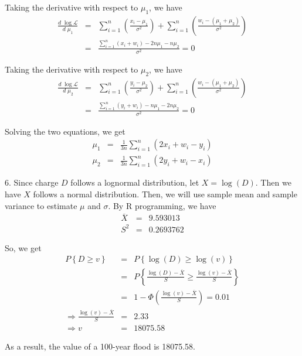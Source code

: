 \documentclass[12pt]{article}
\begin{document}
Taking the derivative with respect to $\mu_1$, we have
\begin{eqnarray*}
  \frac {d \; \log {\mathcal{L}}}{d \; \mu_1}
  &=& \sum_{i=1}^n \left( \frac{x_i - \mu_1}{\sigma^2} \right) + 
  \sum_{i=1}^n \left( \frac{w_i - (\mu_1+\mu_2)}{\sigma^2} \right) \\
  &=& \frac {\sum_{i=1}^n (x_i + w_i) - 2n \mu_1 - n \mu_2}{\sigma^2} = 0
\end{eqnarray*}

Taking the derivative with respect to $\mu_2$, we have
\begin{eqnarray*}
  \frac {d \; \log {\mathcal{L}}}{d \; \mu_2}
  &=& \sum_{i=1}^n \left( \frac{y_i - \mu_2}{\sigma^2} \right) + 
  \sum_{i=1}^n \left( \frac{w_i - (\mu_1+\mu_2)}{\sigma^2} \right) \\
  &=& \frac {\sum_{i=1}^n (y_i + w_i) - n \mu_1 - 2n \mu_2}{\sigma^2} = 0
\end{eqnarray*}

Solving the two equations, we get
\begin{eqnarray*}
  \mu_1 &=& \frac {1}{3n} \sum_{i=1}^n (2x_i + w_i - y_i) \\
  \mu_2 &=& \frac {1}{3n} \sum_{i=1}^n (2y_i + w_i - x_i)
\end{eqnarray*}

6. Since charge $D$ follows a lognormal distribution, let $X = \log (D)$. Then we have $X$ follows a normal distribution. Then, we will use sample mean and sample variance to estimate $\mu$ and $\sigma$. By R programming, we have
\begin{eqnarray*}
  \overline{X} &=& 9.593013 \\
  S^2 &=& 0.2693762
\end{eqnarray*}

So, we get
\begin{eqnarray*}
  P \left\{ D \ge v \right\}
  &=& P \left\{ \log (D) \ge \log (v) \right\} \\
  &=& P \left\{ \frac {\log (D) - \overline{X}}{S}
    \ge \frac {\log (v) - \overline{X}}{S} \right\} \\
  &=& 1 - \Phi \left( \frac {\log (v) - \overline{X}}{S} \right) = 0.01 \\
  \Rightarrow \frac {\log (v) - \overline{X}}{S} &=& 2.33 \\
  \Rightarrow v &=& 18075.58
\end{eqnarray*}

As a result, the value of a 100-year flood is 18075.58. \\
\end{document}
